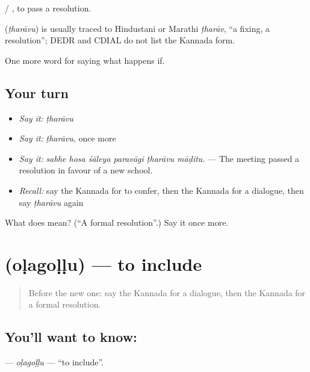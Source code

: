   / , to pass a resolution.

\begin{cousinweb}
\textbf{} (\emph{ṭharāvu}) is usually traced to Hindustani or Marathi \emph{ṭharāv}, \textquotedblleft{}a fixing, a resolution\textquotedblright{}; DEDR and CDIAL do not list the Kannada form.
\end{cousinweb}

\begin{grammarlens}[title={What you've built}]
One more word for saying what happens if.
\end{grammarlens}

\subsection*{Your turn}
\begin{itemize}
\raggedright
  \item \emph{Say it:} \emph{ṭharāvu}
  \item \emph{Say it:} \emph{ṭharāvu}, once more
  \item \emph{Say it:} \emph{sabhe hosa śāleya paravāgi ṭharāvu māḍitu.} — The meeting passed a resolution in favour of a new school.
  \item \emph{Recall:} say the Kannada for to confer, then the Kannada for a dialogue, then say \emph{ṭharāvu} again
\end{itemize}

\begin{tcolorbox}[breakable,colback=teal!4,colframe=teal!35!black,title={Before you move on}]
What does  mean? (\textquotedblleft{}A formal resolution\textquotedblright{}.) Say it once more.
\end{tcolorbox}
\section[\texorpdfstring{\kn{ಒಳಗೊಳ್ಳು} (oḷagoḷḷu)}{ಒಳಗೊಳ್ಳು (oḷagoḷḷu)}]{ (oḷagoḷḷu) — to include}

\label{lesson:KA-C431-olagollu}



\begin{quote}
Before the new one: say the Kannada for a dialogue, then the Kannada for a formal resolution.
\end{quote}

\subsection*{You'll want to know: }
\textbf{} — \emph{oḷagoḷḷu} — \textquotedblleft{}to include\textquotedblright{}.


